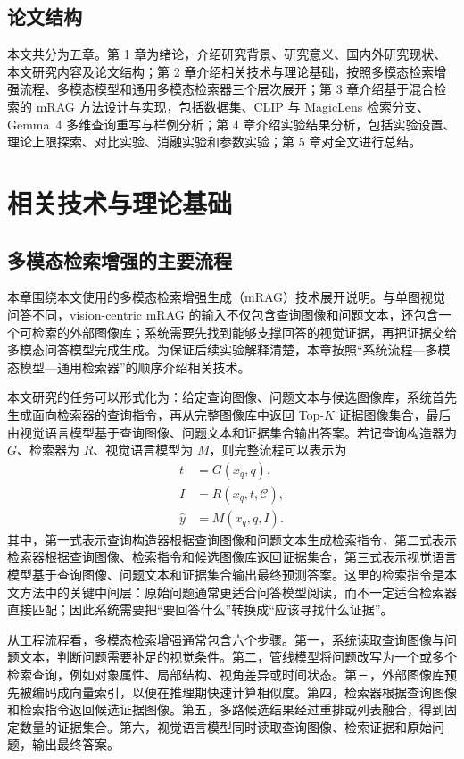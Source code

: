 \section{论文结构}

本文共分为五章。第 1 章为绪论，介绍研究背景、研究意义、国内外研究现状、本文研究内容及论文结构；第 2 章介绍相关技术与理论基础，按照多模态检索增强流程、多模态模型和通用多模态检索器三个层次展开；第 3 章介绍基于混合检索的 mRAG 方法设计与实现，包括数据集、CLIP 与 MagicLens 检索分支、Gemma~4 多维查询重写与样例分析；第 4 章介绍实验结果分析，包括实验设置、理论上限探索、对比实验、消融实验和参数实验；第 5 章对全文进行总结。

\chapter{相关技术与理论基础}

\section{多模态检索增强的主要流程}

本章围绕本文使用的多模态检索增强生成（mRAG）技术展开说明。与单图视觉问答不同，vision-centric mRAG 的输入不仅包含查询图像和问题文本，还包含一个可检索的外部图像库；系统需要先找到能够支撑回答的视觉证据，再把证据交给多模态问答模型完成生成。为保证后续实验解释清楚，本章按照“系统流程—多模态模型—通用检索器”的顺序介绍相关技术。

本文研究的任务可以形式化为：给定查询图像、问题文本与候选图像库，系统首先生成面向检索器的查询指令，再从完整图像库中返回 Top-$K$ 证据图像集合，最后由视觉语言模型基于查询图像、问题文本和证据集合输出答案。若记查询构造器为 $G$、检索器为 $R$、视觉语言模型为 $M$，则完整流程可以表示为
\begin{equation}
\begin{aligned}
t &= G(x_q, q),\\
I &= R(x_q, t, \mathcal{C}),\\
\hat{y} &= M(x_q, q, I).
\end{aligned}
\end{equation}
其中，第一式表示查询构造器根据查询图像和问题文本生成检索指令，第二式表示检索器根据查询图像、检索指令和候选图像库返回证据集合，第三式表示视觉语言模型基于查询图像、问题文本和证据集合输出最终预测答案。这里的检索指令是本文方法中的关键中间层：原始问题通常更适合问答模型阅读，而不一定适合检索器直接匹配；因此系统需要把“要回答什么”转换成“应该寻找什么证据”。

从工程流程看，多模态检索增强通常包含六个步骤。第一，系统读取查询图像与问题文本，判断问题需要补足的视觉条件。第二，管线模型将问题改写为一个或多个检索查询，例如对象属性、局部结构、视角差异或时间状态。第三，外部图像库预先被编码成向量索引，以便在推理期快速计算相似度。第四，检索器根据查询图像和检索指令返回候选证据图像。第五，多路候选结果经过重排或列表融合，得到固定数量的证据集合。第六，视觉语言模型同时读取查询图像、检索证据和原始问题，输出最终答案。

